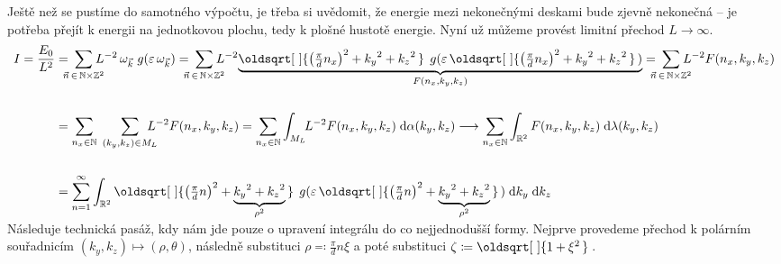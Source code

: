 \documentclass[10pt,a4paper]{article}
\renewcommand*{\sqrt}[2][\ ]{\oldsqrt[#1]{#2\,}\,}
\newcommand*{\mask}[2]{%
    \mathord{\makebox[\widthof{\(#1\)}]{\(#2\)}}%
}
\newcommand{\const}[1]{\text{#1}}
\renewcommand{\d}[1]{\;\const{d}#1}
\def\N{\mathbb{N}}
\def\Z{\mathbb{Z}}
\def\R{\mathbb{R}}
\begin{document}
Ještě než se pustíme do samotného výpočtu, je třeba si uvědomit, že energie mezi nekonečnými deskami bude zjevně nekonečná – je potřeba přejít k energii na jednotkovou plochu, tedy k plošné hustotě energie. Nyní už můžeme provést limitní přechod $L \to \infty$.
\begin{align*}
    I = \frac{E_0}{L^2} &=
    \mask{\;\sum\;\;}{\displaystyle \sum_{\vec n \, \in \, \N \times \Z^2}}
    L^{-2} \,
    \omega_{\vec k} \;
    g(\varepsilon \, \omega_{\vec k})
    =
    \mask{\;\sum\;\;}{\displaystyle \sum_{\vec n \, \in \, \N \times \Z^2}}
    L^{-2} \!
    \underbrace{
        \sqrt{
            \left( \tfrac{\pi}{d} n_x \right)^2 +
            {k_y}^2 + {k_z}^2
        } \;
        g(\varepsilon \, \sqrt{\left( \tfrac{\pi}{d} n_x \right)^2 + {k_y}^2 + {k_z}^2})
    }_{
        F(n_x, k_y, k_z)
    }
    =
    \mask{\;\sum\;\;}{\displaystyle \sum_{\vec n \, \in \, \N \times \Z^2}}
    L^{-2} F(n_x, k_y, k_z)
    \\\\
    &=
    \sum_{n_x \in \N} \;
    \sum_{(k_y, k_z) \in M_L}
    \hspace{-1em}
    L^{-2}
    F(n_x, k_y, k_z)
    =
    \sum_{n_x \in \N}
    \int_{M_L} \!\!
    L^{-2} F(n_x, k_y, k_z)
    \d{\alpha}(k_y, k_z)
    \longrightarrow
    \sum_{n_x \in \N}
    \int_{\R^2}
    F(n_x, k_y, k_z)
    \d{\lambda}(k_y, k_z)
    \\\\
    &=
    \sum_{n = 1}^\infty
    \int_{\R^2}
    \sqrt{
        \left( \tfrac{\pi}{d} n \right)^2 +
        \smash{\underbrace{
            {k_y}^2 + {k_z}^2
        }_{\rho^2}}
    } \;
    g(\varepsilon \, \sqrt{\left( \tfrac{\pi}{d} n \right)^2 +
        \smash{\underbrace{
            {k_y}^2 + {k_z}^2
        }_{\rho^2}}
    })
    \d{k_y} \d{k_z}
\end{align*}
Následuje technická pasáž, kdy nám jde pouze o upravení integrálu do co nejjednodušší formy. Nejprve provedeme přechod k polárním souřadnicím $(k_y, k_z) \mapsto (\rho, \theta)$, následně substituci $\rho \eqqcolon \tfrac{\pi}{d} n \xi$ a poté substituci $\zeta \coloneqq \sqrt{1 + \xi^2}$.
\end{document}
